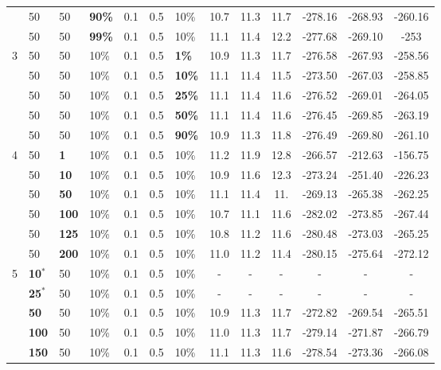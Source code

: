 \begin{sidewaystable}
\begin{tabular}{|l|l|l|l|l|l|l||c|c|c|c|c|c|}
    ~ & 50 & 50 & \textbf{90\%} & 0.1 & 0.5 & 10\% & 10.7 & 11.3 & 11.7 & -278.16 & -268.93 & -260.16 \\
    ~ & 50 & 50 & \textbf{99\%} & 0.1 & 0.5 & 10\% & 11.1 & 11.4 & 12.2 & -277.68 & -269.10 & -253 \\
    \hline
    3 & 50 & 50 & 10\% & 0.1 & 0.5 & \textbf{1\%} & 10.9 & 11.3 & 11.7 & -276.58 & -267.93 & -258.56 \\
    ~ & 50 & 50 & 10\% & 0.1 & 0.5 & \textbf{10\%} & 11.1 & 11.4 & 11.5 & -273.50 & -267.03 & -258.85 \\
    ~ & 50 & 50 & 10\% & 0.1 & 0.5 & \textbf{25\%} & 11.1 & 11.4 & 11.6 & -276.52 & -269.01 & -264.05 \\
    ~ & 50 & 50 & 10\% & 0.1 & 0.5 & \textbf{50\%} & 11.1 & 11.4 & 11.6 & -276.45 & -269.85 & -263.19 \\
    ~ & 50 & 50 & 10\% & 0.1 & 0.5 & \textbf{90\%} &10.9 & 11.3 & 11.8 & -276.49 & -269.80 & -261.10 \\
    \hline
    4 & 50 & \textbf{1} & 10\% & 0.1 & 0.5 & 10\% &11.2 & 11.9 & 12.8 & -266.57 & -212.63 & -156.75 \\
    ~ & 50 & \textbf{10} & 10\% & 0.1 & 0.5 & 10\% & 10.9 & 11.6 & 12.3 & -273.24 & -251.40 & -226.23 \\
    ~ & 50 & \textbf{50} & 10\% & 0.1 & 0.5 & 10\% &  11.1 & 11.4 & 11. & -269.13 & -265.38 & -262.25 \\
    ~ & 50 & \textbf{100} & 10\% & 0.1 & 0.5 & 10\% & 10.7 & 11.1 & 11.6 & -282.02 & -273.85 & -267.44 \\
    ~ & 50 & \textbf{125} & 10\% & 0.1 & 0.5 & 10\% & 10.8 & 11.2 & 11.6 & -280.48 & -273.03 & -265.25 \\
    ~ & 50 & \textbf{200} & 10\% & 0.1 & 0.5 & 10\% & 11.0 & 11.2 & 11.4 & -280.15 & -275.64 & -272.12  \\
    \hline
    5 & \textbf{10$^*$} & 50 & 10\% & 0.1 & 0.5 & 10\% & - & - & - & - & - & - \\
    ~ & \textbf{25$^*$} & 50 & 10\% & 0.1 & 0.5 & 10\% & - & - & - & - & - & - \\
    ~ & \textbf{50} & 50 & 10\% & 0.1 & 0.5 & 10\% &10.9 & 11.3 & 11.7 & -272.82 & -269.54 & -265.51 \\
    ~ & \textbf{100} & 50 & 10\% & 0.1 & 0.5 & 10\% & 11.0 & 11.3 & 11.7 & -279.14 & -271.87 & -266.79 \\
    ~ & \textbf{150} & 50 & 10\% & 0.1 & 0.5 & 10\% & 11.1 & 11.3 & 11.6 & -278.54 & -273.36 & -266.08 \\

\end{tabular}
\end{sidewaystable}
